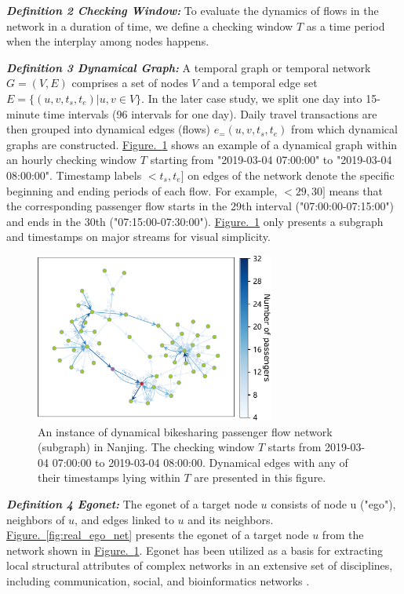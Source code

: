 \documentclass[a4paper,fleqn]{cas-sc}
\begin{document}
\textit{\textbf{Definition 2 Checking Window:}} To evaluate the dynamics of flows in the network in a duration of time, we define a checking window $T$ as a time period when the interplay among nodes happens.

\textit{\textbf{Definition 3 Dynamical Graph:}} A temporal graph or temporal network $G=(V,E)$ comprises a set of nodes $V$ and a temporal edge set $E=\{(u, v, t_{s},t_{e})|u,v\in V\}$. In the later case study, we split one day into 15-minute time intervals (96 intervals for one day). Daily travel transactions are then grouped into dynamical edges (flows) $e_=\left(u, v, t_{s},t_{e}\right)$ from which dynamical graphs are constructed. \hyperref[fig:d_graph_instance]{Figure.~\ref{fig:d_graph_instance}} shows an example of a dynamical graph within an hourly checking window $T$ starting from "2019-03-04 07:00:00" to "2019-03-04 08:00:00". Timestamp labels $<t_{s},t_{e}]$ on edges of the network denote the specific beginning and ending periods of each flow. For example, $<29,30]$ means that the corresponding passenger flow starts in the 29th interval ("07:00:00-07:15:00") and ends in the 30th  ("07:15:00-07:30:00"). \hyperref[fig:d_graph_instance]{Figure.~\ref{fig:d_graph_instance}} only presents a subgraph and timestamps on major streams for visual simplicity.

\begin{figure}[!htb]
  \centering
  \includegraphics[width=0.7\textwidth]{figs/d_graph_instance.pdf}
  \caption{An instance of dynamical bikesharing passenger flow network (subgraph) in Nanjing. The checking window $T$ starts from 2019-03-04 07:00:00 to 2019-03-04 08:00:00. Dynamical edges with any of their timestamps lying within $T$ are presented in this figure.}\label{fig:d_graph_instance}
\end{figure}

\textit{\textbf{Definition 4 Egonet:}} The egonet of a target node $u$ consists of node u ("ego"), neighbors of $u$, and edges linked to $u$ and its neighbors. \hyperref[fig:real_ego_net]{Figure.~\ref{fig:real_ego_net}} presents the egonet of a target node $u$ from the network shown in \hyperref[fig:d_graph_instance]{Figure.~\ref{fig:d_graph_instance}}. Egonet has been utilized as a basis for extracting local structural attributes of complex networks in an extensive set of disciplines, including communication, social, and bioinformatics networks \citep{straits1996ego,edwards2009measures,yang2014egonet}.
\end{document}
